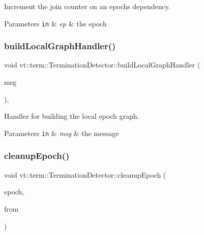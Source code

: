 Increment the join counter on an epoch\textquotesingle{}s dependency. 


\begin{DoxyParams}[1]{Parameters}
\mbox{\tt in}  & {\em ep} & the epoch \\
\hline
\end{DoxyParams}
\mbox{\label{structvt_1_1term_1_1_termination_detector_adb3b87cb03a5991e059bb7930ec5d682}} 
\subsubsection{\texorpdfstring{build\+Local\+Graph\+Handler()}{buildLocalGraphHandler()}}
{\footnotesize\ttfamily void vt\+::term\+::\+Termination\+Detector\+::build\+Local\+Graph\+Handler (\begin{DoxyParamCaption}\item[{\hyperlink{structvt_1_1term_1_1_build_graph_msg}{Build\+Graph\+Msg} $\ast$}]{msg }\end{DoxyParamCaption})\hspace{0.3cm}{\ttfamily [static]}, {\ttfamily [private]}}



Handler for building the local epoch graph. 


\begin{DoxyParams}[1]{Parameters}
\mbox{\tt in}  & {\em msg} & the message \\
\hline
\end{DoxyParams}
\mbox{\label{structvt_1_1term_1_1_termination_detector_a40a2ebe4e220dace273cc6570dd70b01}} 
\subsubsection{\texorpdfstring{cleanup\+Epoch()}{cleanupEpoch()}}
{\footnotesize\ttfamily void vt\+::term\+::\+Termination\+Detector\+::cleanup\+Epoch (\begin{DoxyParamCaption}\item[{\hyperlink{namespacevt_a985a5adf291c34a3ca263b3378388236}{Epoch\+Type} const \&}]{epoch,  }\item[{\hyperlink{structvt_1_1term_1_1_termination_detector_a4f3ede9a87f39d86e85f92b36a6c6a30}{Call\+From\+Enum}}]{from }\end{DoxyParamCaption})\hspace{0.3cm}{\ttfamily [private]}}



